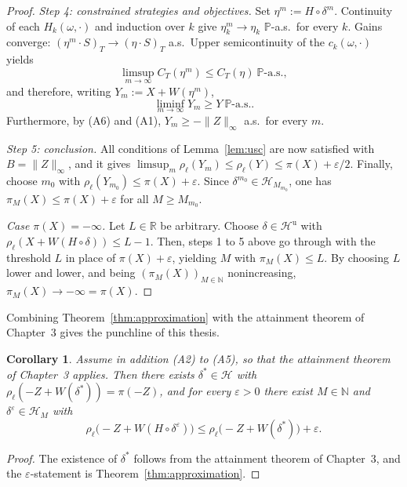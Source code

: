 \documentclass[11pt,a4paper]{report}
\numberwithin{equation}{chapter}
\theoremstyle{plain}
\newtheorem{corollary}[proposition]{Corollary}
\theoremstyle{definition}
\newcommand{\PP}{\mathbb{P}}
\newcommand{\R}{\mathbb{R}}
\newcommand{\N}{\mathbb{N}}
\newcommand{\HH}{\mathcal{H}}
\newcommand{\Hu}{\mathcal{H}^{\mathrm{u}}}
\newcommand{\as}{\ \PP\text{-a.s.}}
\begin{document}
\begin{proof}
  \textit{Step 4: constrained strategies and objectives.}
  Set $\eta^m:=H\circ\delta^m$. Continuity of each $H_k(\omega,\cdot)$
  and induction over $k$ give $\eta^m_k\to\eta_k$ $\PP$-a.s.\ for every
  $k$. Gains converge: $(\eta^m\cdot S)_T\to(\eta\cdot S)_T$ a.s.\ Upper
  semicontinuity of the $c_k(\omega,\cdot)$ yields
  \[
    \limsup_{m\to\infty}C_T(\eta^m)\le C_T(\eta)\as,
  \]
  and therefore, writing $Y_m:=X+W(\eta^m)$,
  \[
    \liminf_{m\to\infty}Y_m\ge Y\as.
  \]
  Furthermore, by (A6) and (A1), $Y_m\ge-\|Z\|_\infty$ a.s.\ for every
  $m$.

  \textit{Step 5: conclusion.}
  All conditions of Lemma~\ref{lem:usc} are now satisfied with
  $B=\|Z\|_\infty$, and it gives
  $\limsup_m\rho_\ell(Y_m)\le\rho_\ell(Y)\le\pi(X)+\varepsilon/2$.
  Finally, choose $m_0$ with $\rho_\ell(Y_{m_0})\le\pi(X)+\varepsilon$.
  Since $\delta^{m_0}\in\HH_{M_{m_0}}$, one has
  $\pi_M(X)\le\pi(X)+\varepsilon$ for all $M\ge M_{m_0}$.

  \textit{Case $\pi(X)=-\infty$.}
  Let $L\in\R$ be arbitrary. Choose $\delta\in\Hu$ with
  $\rho_\ell(X+W(H\circ\delta))\le L-1$. Then, steps 1 to 5 above go
  through with the threshold $L$ in place of $\pi(X)+\varepsilon$,
  yielding $M$ with $\pi_M(X)\le L$. By choosing $L$ lower and lower,
  and being $(\pi_M(X))_{M\in\N}$ nonincreasing,
  $\pi_M(X)\to-\infty=\pi(X)$.
\end{proof}

Combining Theorem~\ref{thm:approximation} with the attainment theorem
of Chapter~3 gives the punchline of this thesis.

\begin{corollary}\label{cor:attained}
  Assume in addition \textup{(A2)} to \textup{(A5)}, so that the
  attainment theorem of Chapter~3 applies. Then there exists
  $\delta^*\in\HH$ with $\rho_\ell(-Z+W(\delta^*))=\pi(-Z)$, and for
  every $\varepsilon>0$ there exist $M\in\N$ and
  $\delta^\varepsilon\in\HH_M$ with
  \[
    \rho_\ell\bigl(-Z+W(H\circ\delta^\varepsilon)\bigr)
    \le\rho_\ell\bigl(-Z+W(\delta^*)\bigr)+\varepsilon.
  \]
\end{corollary}

\begin{proof}
  The existence of $\delta^*$ follows from the attainment theorem of
  Chapter~3, and the $\varepsilon$-statement is
  Theorem~\ref{thm:approximation}.
\end{proof}
\end{document}
